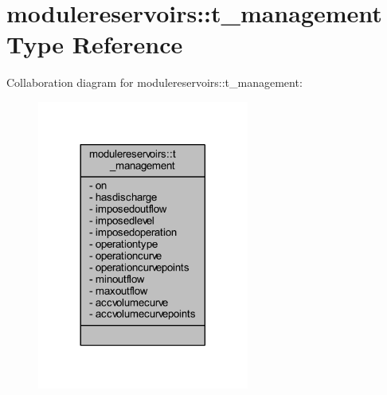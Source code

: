 \hypertarget{structmodulereservoirs_1_1t__management}{}\section{modulereservoirs\+:\+:t\+\_\+management Type Reference}
\label{structmodulereservoirs_1_1t__management}


Collaboration diagram for modulereservoirs\+:\+:t\+\_\+management\+:\nopagebreak
\begin{figure}[H]
\begin{center}
\leavevmode
\includegraphics[width=197pt]{structmodulereservoirs_1_1t__management__coll__graph}
\end{center}
\end{figure}

